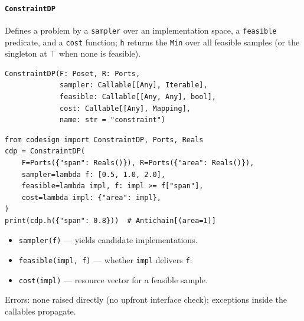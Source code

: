 \documentclass[11pt,a4paper]{article}
\newcommand{\topp}{\top}
\begin{document}
\paragraph{\texttt{ConstraintDP}}
\label{ref:dp:constraintdp}
Defines a problem by a \texttt{sampler} over an implementation space, a
\texttt{feasible} predicate, and a \texttt{cost} function; \texttt{h}
returns the \texttt{Min} over all feasible samples (or the singleton at
$\topp$ when none is feasible).
\begin{lstlisting}
ConstraintDP(F: Poset, R: Ports,
             sampler: Callable[[Any], Iterable],
             feasible: Callable[[Any, Any], bool],
             cost: Callable[[Any], Mapping],
             name: str = "constraint")
\end{lstlisting}
\begin{lstlisting}
from codesign import ConstraintDP, Ports, Reals
cdp = ConstraintDP(
    F=Ports({"span": Reals()}), R=Ports({"area": Reals()}),
    sampler=lambda f: [0.5, 1.0, 2.0],
    feasible=lambda impl, f: impl >= f["span"],
    cost=lambda impl: {"area": impl},
)
print(cdp.h({"span": 0.8}))  # Antichain[(area=1)]
\end{lstlisting}
\begin{itemize}[nosep]
  \item \texttt{sampler(f)} --- yields candidate implementations.
  \item \texttt{feasible(impl, f)} --- whether \texttt{impl} delivers
        \texttt{f}.
  \item \texttt{cost(impl)} --- resource vector for a feasible sample.
\end{itemize}
Errors: none raised directly (no upfront interface check); exceptions
inside the callables propagate.
\end{document}
